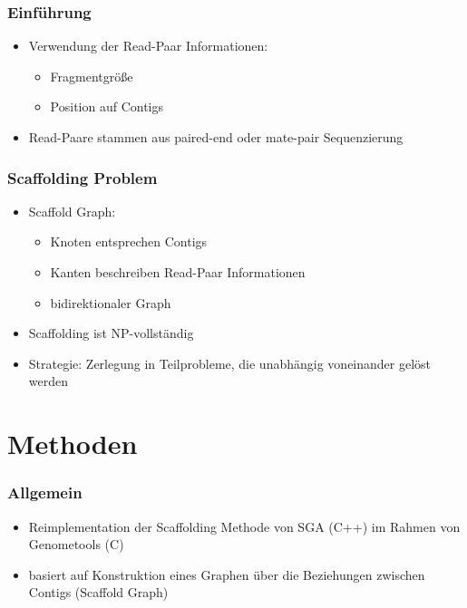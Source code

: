 \documentclass[xcolor=pst]{beamer}
\begin{document}
\begin{frame}
  \frametitle{Einführung}
  \begin{itemize}
  \item Verwendung der Read-Paar Informationen:
    \begin{itemize}
    \item Fragmentgröße
    \item Position auf Contigs
    \end{itemize}
  \item Read-Paare stammen aus paired-end oder mate-pair Sequenzierung
  \end{itemize}
\end{frame}

\begin{frame}
  \frametitle{Scaffolding Problem}
  \begin{itemize}
  \item Scaffold Graph:
    \begin{itemize}
    \item Knoten entsprechen Contigs
    \item Kanten beschreiben Read-Paar
      Informationen
    \item bidirektionaler Graph
    \end{itemize}
  \item Scaffolding ist NP-vollständig
  \item Strategie: Zerlegung in
    Teilprobleme, die unabhängig voneinander gelöst werden
  \end{itemize}
\end{frame}

\section{Methoden}
\begin{frame}
  \frametitle{Allgemein}
  \begin{itemize}
  \item Reimplementation der Scaffolding Methode von SGA (C++) im
    Rahmen von Genometools (C)
  \item basiert auf Konstruktion eines Graphen über die Beziehungen
    zwischen Contigs (Scaffold Graph)
  \end{itemize}
\end{frame}
\end{document}
